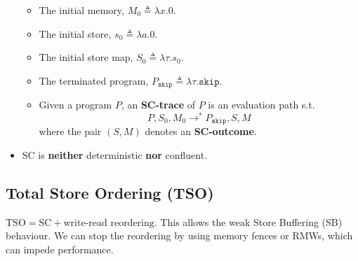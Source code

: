 \documentclass[twocolumn,landscape,10pt]{article}
\theoremstyle{definition}
\begin{document}
\begin{itemize}
        \begin{itemize}
            \item The initial memory, $M_0\triangleq\lambda x.0$.
            \item The initial store, $s_0\triangleq\lambda a.0$.
            \item The initial store map, $S_0\triangleq\lambda\tau.s_0$.
            \item The terminated program,
                $P_{\texttt{skip}}\triangleq\lambda\tau.\texttt{skip}$.
            \item Given a program $P$, an \textbf{SC-trace} of $P$ is an
                evaluation path s.t.
                \[
                    P,S_0,M_0\rightarrow^*P_{\texttt{skip}},S,M
                \]
                where the pair $(S,M)$ denotes an \textbf{SC-outcome}.
        \end{itemize} 
    \item SC is \textbf{neither} deterministic \textbf{nor} confluent.
\end{itemize} 

\subsection{Total Store Ordering (TSO)}

$\text{TSO}=\text{SC}+\text{write-read reordering}$. This allows the weak 
Store Buffering (SB) behaviour. We can stop the reordering by using memory
fences or RMWs, which can impede performance.
\end{document}
